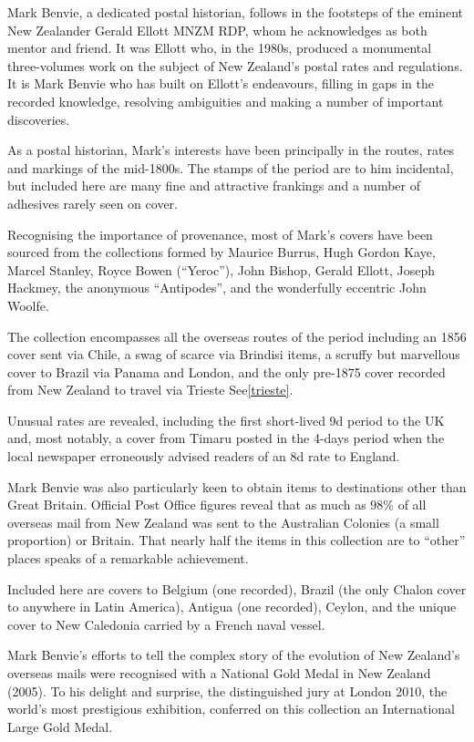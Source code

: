 \documentclass[justified]{tufte-book}
\begin{document}
Mark Benvie, a dedicated postal historian, follows in the footsteps of the eminent New Zealander Gerald Ellott MNZM RDP, whom he acknowledges as both mentor and friend.  It was Ellott who, in the 1980s, produced a monumental three-volumes work on the subject of New Zealand’s postal rates and regulations.  It is Mark Benvie who has built on Ellott’s endeavours, filling in gaps in the recorded knowledge, resolving ambiguities and making a number of important discoveries.

As a postal historian, Mark’s interests have been principally in the routes, rates and markings of the mid-1800s.  The stamps of the period are to him incidental, but included here are many fine and attractive frankings and a number of adhesives rarely seen on cover.

Recognising the importance of provenance, most of Mark’s covers have been sourced from the collections formed by Maurice Burrus, Hugh Gordon Kaye, Marcel Stanley, Royce Bowen (“Yeroc”), John Bishop, Gerald Ellott, Joseph Hackmey, the anonymous “Antipodes”, and the wonderfully eccentric John Woolfe.

The collection encompasses all the overseas routes of the period including an 1856 cover sent via Chile, a swag of scarce via Brindisi items, a scruffy but marvellous cover to Brazil via Panama and London, and the only pre-1875 cover recorded from New Zealand to travel via Trieste See\ref{trieste}.

Unusual rates are revealed, including the first short-lived 9d period to the UK and, most notably, a cover from Timaru posted in the 4-days period when the local newspaper erroneously advised readers of an 8d rate to England.

Mark Benvie was also particularly keen to obtain items to destinations other than Great Britain.  Official Post Office figures reveal that as much as 98\% of all overseas mail from New Zealand was sent to the Australian Colonies (a small proportion) or Britain.  That nearly half the items in this collection are to “other” places speaks of a remarkable achievement.

Included here are covers to Belgium (one recorded), Brazil (the only Chalon cover to anywhere in Latin America), Antigua (one recorded), Ceylon, and the unique cover to New Caledonia carried by a French naval vessel.

Mark Benvie’s efforts to tell the complex story of the evolution of New Zealand’s overseas mails were recognised with a National Gold Medal in New Zealand (2005).  To his delight and surprise, the distinguished jury at London 2010, the world’s most prestigious exhibition, conferred on this collection an International Large Gold Medal.
\end{document}
